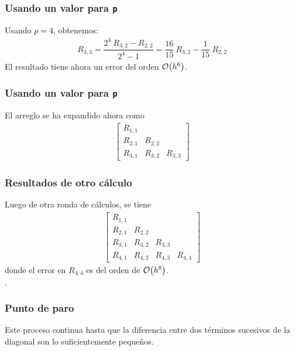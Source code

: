 \begin{frame}
\frametitle{Usando un valor para \texttt{p}}
Usando $p = 4$, obtenemos:
\begin{align*}
R_{3, 3} = \dfrac{2^{4} \: R_{3, 2}-R_{2, 2}}{2^{4} - 1} = \dfrac{16}{15} \: R_{3, 2} - \dfrac{1}{15} \: R_{2, 2}
\end{align*}
El resultado tiene ahora un error del orden $\order{h^{6}}$.
\end{frame}
\begin{frame}
\frametitle{Usando un valor para \texttt{p}}
El arreglo se ha expandido ahora como
\begin{align*}
\begin{bmatrix}
R_{1, 1} &  & \\
R_{2, 1} & R_{2, 2} & \\
R_{3, 1} & R_{3, 2} & R_{3, 3}
\end{bmatrix}
\end{align*}
\end{frame}
\begin{frame}
\frametitle{Resultados de otro cálculo}
Luego de otra ronda de cálculos, se tiene
\begin{align*}
\begin{bmatrix}
R_{1, 1} &  & & \\
R_{2, 1} & R_{2, 2} & & \\
R_{3, 1} & R_{3, 2} & R_{3, 3} & \\
R_{4, 1} & R_{4, 2} & R_{4, 3} & R_{4, 4}
\end{bmatrix}
\end{align*}
donde el error en $R_{4, 4}$ es del orden de $\order{h^{8}}$.
\\
\bigskip
\pause
{}.
\end{frame}
\begin{frame}
\frametitle{Punto de paro}
Este proceso continua hasta que la diferencia entre dos términos sucesivos de la diagonal son lo suficientemente pequeños.
\end{frame}
